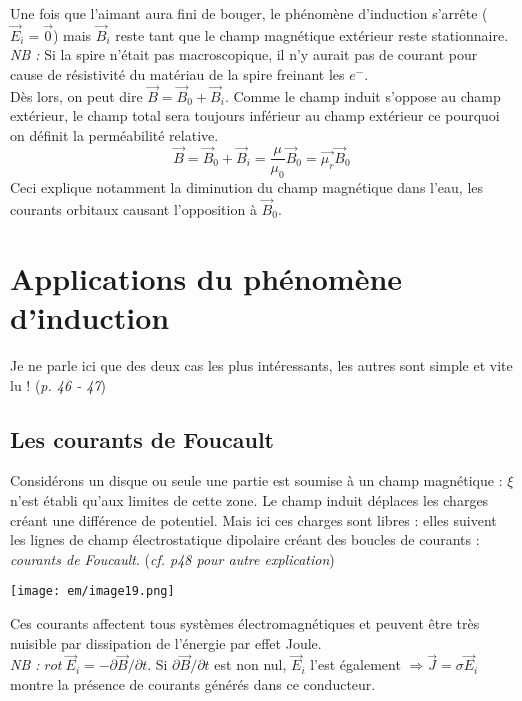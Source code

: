 \documentclass[british,french,11pt, a4paper, openany]{book}
\begin{document}
Une fois que l'aimant aura fini de bouger, le phénomène d'induction s'arrête ($\vec{E}_i = \vec{0}$) mais $\vec{B}_i$ reste tant que le champ magnétique extérieur reste stationnaire.\\

\textit{NB :} Si la spire n'était pas macroscopique, il  n'y aurait pas de courant pour cause de résistivité du matériau de la spire freinant les $e^-$.\\

Dès lors, on peut dire $\vec{B} = \vec{B}_0 + \vec{B}_i$. Comme le champ induit s'oppose au champ extérieur, le champ total sera toujours inférieur au champ extérieur ce pourquoi on définit la perméabilité relative.
\begin{equation}
	\vec{B} = \vec{B}_0 + \vec{B}_i = \frac{\mu}{\mu_0}\vec{B}_0 = \vec{\mu_r}\vec{B}_0
\end{equation}
Ceci explique notamment la diminution du champ magnétique dans l'eau, les courants orbitaux causant l'opposition à $\vec{B}_0$.

\section{Applications du phénomène d'induction}
Je ne parle ici que des deux cas les plus intéressants, les autres sont simple et vite lu ! (\textit{p. 46 - 47})
\subsection{Les courants de Foucault}
Considérons un disque ou seule une partie est soumise à un champ magnétique : $\xi$ n'est établi qu'aux limites de cette zone. Le champ induit déplaces les charges créant une différence de potentiel. Mais ici ces charges sont libres : elles suivent les lignes de champ électrostatique dipolaire créant des boucles de courants : \textit{courants de Foucault}. (\textit{cf. p48 pour autre explication})
\begin{center}
	\texttt{[image: em/image19.png]}\\
\end{center}
Ces courants affectent tous systèmes électromagnétiques et peuvent être très nuisible par dissipation de l'énergie par effet Joule. \\
\textit{NB :} $rot\ \vec{E}_i = -\partial\vec{B}/\partial t$. Si $\partial\vec{B}/\partial t$ est non nul, $\vec{E}_i$ l'est également $\Rightarrow \vec{J} = \sigma\vec{E}_i$ montre la présence de courants générés dans ce conducteur.
\end{document}
